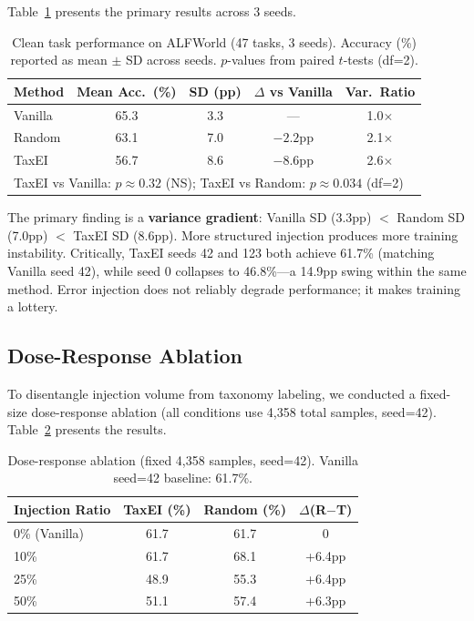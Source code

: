 \documentclass[11pt,a4paper]{article}
\begin{document}
Table~\ref{tab:main} presents the primary results across 3 seeds.

\begin{table}[t]
\centering
\small
\caption{Clean task performance on ALFWorld (47 tasks, 3 seeds). Accuracy (\%) reported as mean $\pm$ SD across seeds. $p$-values from paired $t$-tests (df=2).}
\label{tab:main}
\begin{tabular}{lcccc}
\toprule
\textbf{Method} & \textbf{Mean Acc.\ (\%)} & \textbf{SD (pp)} & \textbf{$\Delta$ vs Vanilla} & \textbf{Var.\ Ratio} \\
\midrule
Vanilla & 65.3 & 3.3 & --- & 1.0$\times$ \\
Random & 63.1 & 7.0 & $-2.2$pp & 2.1$\times$ \\
TaxEI & 56.7 & 8.6 & $-8.6$pp & 2.6$\times$ \\
\midrule
\multicolumn{5}{l}{\small TaxEI vs Vanilla: $p \approx 0.32$ (NS); TaxEI vs Random: $p \approx 0.034$ (df=2)} \\
\bottomrule
\end{tabular}
\end{table}

The primary finding is a \textbf{variance gradient}: Vanilla SD (3.3pp) $<$ Random SD (7.0pp) $<$ TaxEI SD (8.6pp). More structured injection produces more training instability. Critically, TaxEI seeds 42 and 123 both achieve 61.7\% (matching Vanilla seed 42), while seed 0 collapses to 46.8\%---a 14.9pp swing within the same method. Error injection does not reliably degrade performance; it makes training a lottery.

\subsection{Dose-Response Ablation}

To disentangle injection volume from taxonomy labeling, we conducted a fixed-size dose-response ablation (all conditions use 4,358 total samples, seed=42). Table~\ref{tab:dose} presents the results.

\begin{table}[t]
\centering
\small
\caption{Dose-response ablation (fixed 4,358 samples, seed=42). Vanilla seed=42 baseline: 61.7\%.}
\label{tab:dose}
\begin{tabular}{lccc}
\toprule
\textbf{Injection Ratio} & \textbf{TaxEI (\%)} & \textbf{Random (\%)} & \textbf{$\Delta$(R$-$T)} \\
\midrule
0\% (Vanilla) & 61.7 & 61.7 & 0 \\
10\% & 61.7 & 68.1 & +6.4pp \\
25\% & 48.9 & 55.3 & +6.4pp \\
50\% & 51.1 & 57.4 & +6.3pp \\
\bottomrule
\end{tabular}
\end{table}
\end{document}
